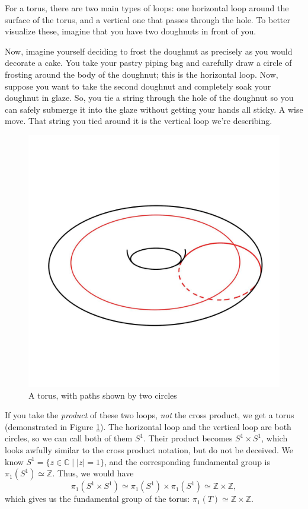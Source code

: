 \documentclass[12pt,a4paper,reqno,parskip=full]{amsart}
\numberwithin{equation}{section}
\theoremstyle{plain}
\theoremstyle{definition}
\def\Z{{\mathbb Z}}
\def\C{{\mathbb C}}
\begin{document}
For a torus, there are two main types of loops: one horizontal loop around the surface of the torus, and a vertical one that passes through the hole. To better visualize these, imagine that you have two doughnuts in front of you.

Now, imagine yourself deciding to frost the doughnut as precisely as you would decorate a cake. You take your pastry piping bag and carefully draw a circle of frosting around the body of the doughnut; this is the horizontal loop. Now, suppose you want to take the second doughnut and completely soak your doughnut in glaze. So, you tie a string through the hole of the doughnut so you can safely submerge it into the glaze without getting your hands all sticky. A wise move. That string you tied around it is the vertical loop we're describing.

\begin{figure}
    \centering
    \captionsetup{justification=centering}
    \includegraphics[width=0.5\linewidth]{images/torus with curves.jpg}
    \caption{A torus, with paths shown by two circles}
    \label{fig:two circles}
\end{figure}

If you take the \textit{product} of these two loops, \textit{not} the cross product, we get a torus (demonstrated in Figure \ref{fig:two circles}). The horizontal loop and the vertical loop are both circles, so we can call both of them $S^1$. Their product becomes $S^1\times S^1$, which looks awfully similar to the cross product notation, but do not be deceived. We know $S^1=\{z\in\C\mid|z|=1\}$, and the corresponding fundamental group is $\pi_1(S^1)\simeq\Z$. Thus, we would have
\[\pi_1(S^1\times S^1)\simeq\pi_1(S^1)\times\pi_1(S^1)\simeq\Z\times\Z,\]
which gives us the fundamental group of the torus: $\pi_1(T)\simeq\Z\times\Z.$
\end{document}

